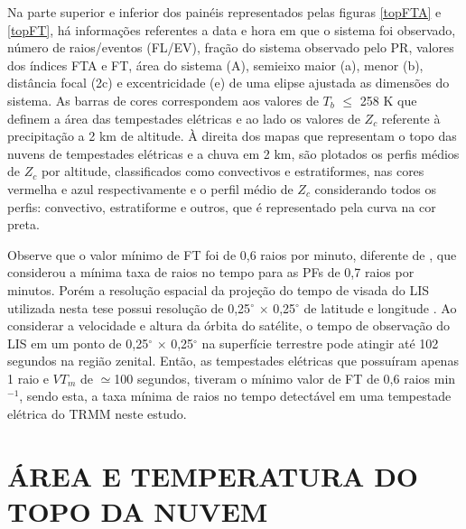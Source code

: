 Na parte superior e inferior dos painéis representados pelas figuras \ref{topFTA} e \ref{topFT}, há informações referentes a data e hora em que o sistema foi observado, número de raios/eventos (FL/EV), fração do sistema observado pelo PR, valores dos índices FTA e FT, área do sistema (A), semieixo maior (a), menor (b), distância focal (2c) e excentricidade (e) de uma elipse ajustada as dimensões do sistema. As barras de cores  correspondem aos valores de $T_b$ $\leq$ 258 K que definem a área das tempestades elétricas e ao lado os valores de $Z_c$ referente à precipitação a 2 km de altitude. À direita dos mapas que representam o topo das nuvens de tempestades elétricas e a chuva em 2 km, são plotados os perfis médios de $Z_c$ por altitude, classificados como convectivos e estratiformes, nas cores vermelha e azul respectivamente e o perfil médio de $Z_c$ considerando todos os perfis: convectivo, estratiforme e outros, que é representado pela curva na cor preta.

Observe que o valor mínimo de FT foi de 0,6 raios por minuto, diferente de , que considerou a mínima taxa de raios no tempo para as PFs de 0,7 raios por minutos. Porém a resolução espacial da projeção do tempo de visada do LIS utilizada nesta tese possui resolução de 0,25$^{\circ}$ $\times$ 0,25$^{\circ}$ de latitude e longitude  \cite{albrecht2011b}. Ao considerar a velocidade e altura da órbita do satélite, o tempo de observação do LIS em um ponto de 0,25$^{\circ}$ $\times$ 0,25$^{\circ}$ na superfície terrestre pode atingir até 102 segundos na região zenital. Então, as tempestades elétricas que possuíram apenas 1 raio e $VT_m$ de $\simeq$100 segundos, tiveram o mínimo valor de FT de 0,6 raios min$^{-1}$, sendo esta, a taxa mínima de raios no tempo detectável em uma tempestade elétrica do TRMM neste estudo.



\section{ÁREA E TEMPERATURA DO TOPO DA NUVEM}


